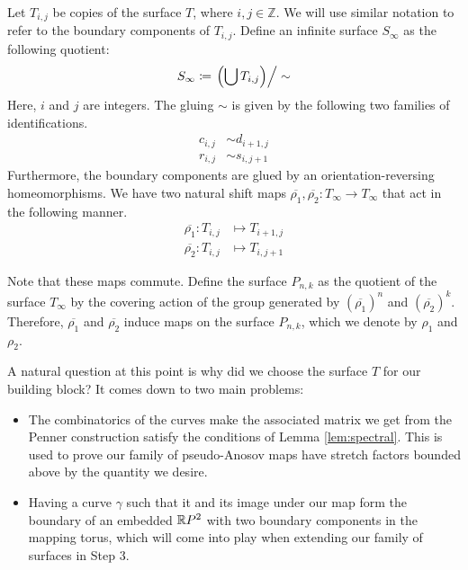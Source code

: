 Let $T_{i,j}$ be copies of the surface $T$, where $i,j \in \mathbb{Z}$. We will use similar notation to refer
to the boundary components of $T_{i,j}$. Define an infinite surface $S_\infty$ as the following quotient:
\begin{align*}
  S_\infty \coloneqq \left. \left( \bigcup T_{i,j} \right)\right/\sim
\end{align*}
Here, $i$ and $j$ are integers. The gluing $\sim$ is given by the following two families of
identifications.
\begin{align*}
  c_{i,j} &\sim d_{i+1,j} \\
  r_{i,j} &\sim s_{i,j+1}
\end{align*}
Furthermore, the boundary components are glued by an orientation-reversing homeomorphisms.  We have two
natural shift maps $\overline{\rho_1},\overline{\rho_2}: T_\infty \to T_\infty$ that act in the
following manner.
\begin{align*}
  \overline{\rho_1}: T_{i,j} &\mapsto T_{i+1, j} \\
  \overline{\rho_2}: T_{i,j} &\mapsto T_{i, j+1}
\end{align*}

Note that these maps commute. Define the surface $P_{n,k}$ as the quotient of the surface $T_\infty$ by the
covering action of the group generated by $(\overline{\rho_1})^n$ and $(\overline{\rho_2})^k$. Therefore,
$\overline{\rho_1}$ and $\overline{\rho_2}$ induce maps on the surface $P_{n,k}$, which we denote by $\rho_1$
and $\rho_2$.

A natural question at this point is why did we choose the surface $T$ for our building block? It comes down to
two main problems:
\begin{itemize}
\item The combinatorics of the curves make the associated matrix we get from the Penner construction satisfy
  the conditions of Lemma \ref{lem:spectral}. This is used to prove our family of pseudo-Anosov maps have
  stretch factors bounded above by the quantity we desire.
\item Having a curve $\gamma$ such that it and its image under our map form the boundary of an embedded
  $\mathbb{R} P^2$ with two boundary components in the mapping torus, which will come into play when extending our family of surfaces in Step 3.
\end{itemize}

